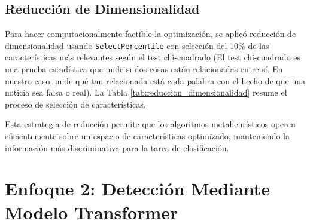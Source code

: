 \subsection{Reducción de Dimensionalidad}

Para hacer computacionalmente factible la optimización, se aplicó reducción de dimensionalidad usando \texttt{SelectPercentile} con selección del 10\% de las características más relevantes según el test chi-cuadrado (El test chi-cuadrado es una prueba estadística que mide si dos cosas están relacionadas entre sí. En nuestro caso, mide qué tan relacionada está cada palabra con el hecho de que una noticia sea falsa o real). La Tabla \ref{tab:reduccion_dimensionalidad} resume el proceso de selección de características.

\begin{table}[htbp]
\centering
{}
\caption{Configuración del proceso de reducción de dimensionalidad.}
\label{tab:reduccion_dimensionalidad}
\end{table}

Esta estrategia de reducción permite que los algoritmos metaheurísticos operen eficientemente sobre un espacio de características optimizado, manteniendo la información más discriminativa para la tarea de clasificación.

\section{Enfoque 2: Detección Mediante Modelo Transformer}
\label{sec:enfoque_transformer}

